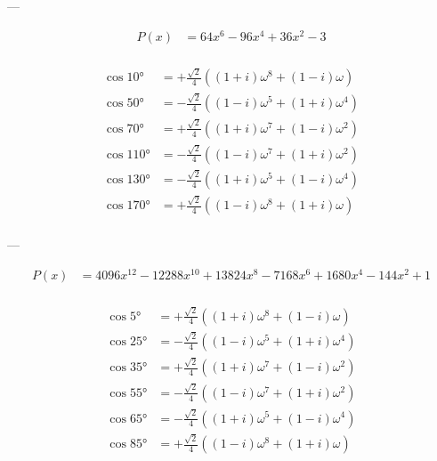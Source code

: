 ---

$$
\begin{aligned}
    P(x) &= 64 x^6-96 x^4+36 x^2-3\\
\end{aligned}
$$

$$
\begin{aligned}
    \cos 10°  &= +\frac{\sqrt{2}}{4} \left((1+i)\omega^8+(1-i)\omega\right)\\
    \cos 50°  &= -\frac{\sqrt{2}}{4} \left((1-i)\omega^5+(1+i)\omega^4\right)\\
    \cos 70°  &= +\frac{\sqrt{2}}{4} \left((1+i)\omega^7+(1-i)\omega^2\right)\\
    \cos 110° &= -\frac{\sqrt{2}}{4} \left((1-i)\omega^7+(1+i)\omega^2\right)\\
    \cos 130° &= -\frac{\sqrt{2}}{4} \left((1+i)\omega^5+(1-i)\omega^4\right)\\
    \cos 170° &= +\frac{\sqrt{2}}{4} \left((1-i)\omega^8+(1+i)\omega\right)\\
\end{aligned}
$$

---

$$
\begin{aligned}
    P(x) &= 4096 x^{12}-12288 x^{10}+13824 x^8-7168 x^6+1680 x^4-144 x^2+1\\
\end{aligned}
$$

$$
\begin{aligned}
    \cos 5°  &= +\frac{\sqrt{2}}{4} \left((1+i)\omega^8+(1-i)\omega\right)\\
    \cos 25° &= -\frac{\sqrt{2}}{4} \left((1-i)\omega^5+(1+i)\omega^4\right)\\
    \cos 35° &= +\frac{\sqrt{2}}{4} \left((1+i)\omega^7+(1-i)\omega^2\right)\\
    \cos 55° &= -\frac{\sqrt{2}}{4} \left((1-i)\omega^7+(1+i)\omega^2\right)\\
    \cos 65° &= -\frac{\sqrt{2}}{4} \left((1+i)\omega^5+(1-i)\omega^4\right)\\
    \cos 85° &= +\frac{\sqrt{2}}{4} \left((1-i)\omega^8+(1+i)\omega\right)\\
\end{aligned}
$$
